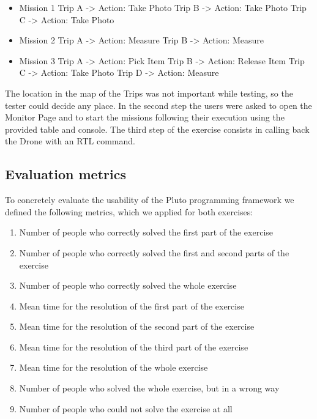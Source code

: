 \begin{itemize}
\item Mission 1
	\subitem Trip A -> Action: Take Photo
    \subitem Trip B -> Action: Take Photo
    \subitem Trip C -> Action: Take Photo
\item Mission 2
	\subitem Trip A -> Action: Measure
    \subitem Trip B -> Action: Measure
\item Mission 3
	\subitem Trip A -> Action: Pick Item
    \subitem Trip B -> Action: Release Item
    \subitem Trip C -> Action: Take Photo
    \subitem Trip D -> Action: Measure
\end{itemize}

The location in the map of the Trips was not important while testing, so the tester could decide any place.
In the second step the users were asked to open the Monitor Page and to start the missions following their execution using the provided table and console.
The third step of the exercise consists in calling back the Drone with an RTL command.


\subsection{Evaluation metrics}\label{metrics}

To concretely evaluate the usability of the Pluto programming framework we defined the following metrics, which we applied for both exercises:

\begin{enumerate}
\item {Number of people who correctly solved the first part of the exercise}
\item {Number of people who correctly solved the first and second parts of the exercise}
\item {Number of people who correctly solved the whole exercise}
\item {Mean time for the resolution of the first part of the exercise}
\item {Mean time for the resolution of the second part of the exercise}
\item {Mean time for the resolution of the third part of the exercise}
\item {Mean time for the resolution of the whole exercise}
\item {Number of people who solved the whole exercise, but in a wrong way}
\item {Number of people who could not solve the exercise at all}
\end{enumerate}

